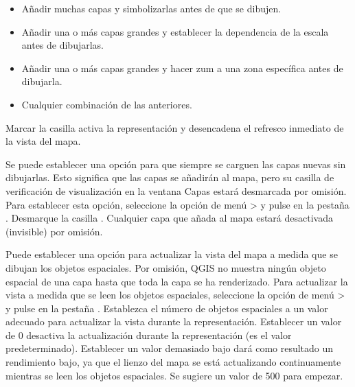 \begin{itemize}
\item Añadir muchas capas y simbolizarlas antes de que se dibujen.
\item Añadir una o más capas grandes y establecer la dependencia de la escala antes de dibujarlas.
\item Añadir una o más capas grandes y hacer zum a una zona específica antes de dibujarla.
\item Cualquier combinación de las anteriores.
\end{itemize}

Marcar la casilla  activa la representación y desencadena el refresco inmediato de la vista del mapa.

\label{label_settinglayer}

Se puede establecer una opción para que siempre se carguen las capas nuevas sin dibujarlas. Esto
significa que las capas se añadirán al mapa, pero su casilla de verificación de visualización en la ventana Capas estará 
desmarcada por omisión. Para establecer esta opción, seleccione la opción de menú  > 
y pulse en la pestaña . Desmarque la casilla . Cualquier capa que añada al mapa estará desactivada (invisible) por omisión.

%
%

\label{label_updatemap}

Puede establecer una opción para actualizar la vista del mapa a medida que se dibujan los objetos espaciales. Por
omisión, QGIS no muestra ningún objeto espacial de una capa hasta que toda la capa se ha renderizado. 
Para actualizar la vista a medida que se leen los objetos espaciales, seleccione la opción de menú
 >  y pulse en la pestaña . 
Establezca el número de objetos espaciales a un valor adecuado para actualizar la vista durante la representación.
Establecer un valor de 0 desactiva la actualización durante la representación (es el valor predeterminado).
Establecer un valor demasiado bajo dará como resultado un rendimiento bajo, ya que el lienzo del mapa se está
actualizando continuamente mientras se leen los objetos espaciales. Se sugiere un valor de 500 para empezar. 

